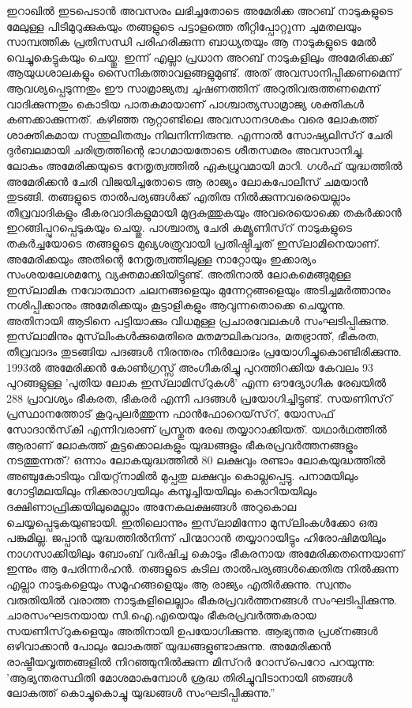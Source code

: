 ഇറാഖില്‍ ഇടപെടാന്‍ അവസരം ലഭിച്ചതോടെ അമേരിക്ക അറബ് നാടുകളുടെ മേലുള്ള പിടിമുറുക്കുകയും തങ്ങളുടെ പട്ടാളത്തെ തീറ്റിപ്പോറ്റുന്ന ചുമതലയും സാമ്പത്തിക പ്രതിസന്ധി പരിഹരിക്കുന്ന ബാധ്യതയും ആ നാടുകളുടെ മേല്‍ വെച്ചുകെട്ടുകയും ചെയ്തു. ഇന്ന് എല്ലാ പ്രധാന അറബ് നാടുകളിലും അമേരിക്കക്ക് ആയുധശാലകളും സൈനികത്താവളങ്ങളുമുണ്ട്. അത് അവസാനിപ്പിക്കണമെന്ന് ആവശ്യപ്പെടുന്നതും ഈ സാമ്രാജ്യത്വ ചൂഷണത്തിന് അറുതിവരുത്തണമെന്ന് വാദിക്കുന്നതും കൊടിയ പാതകമായാണ് പാശ്ചാത്യസാമ്രാജ്യ ശക്തികള്‍ കണക്കാക്കുന്നത്.
കഴിഞ്ഞ നൂറ്റാണ്ടിലെ അവസാനദശകം വരെ ലോകത്ത് ശാക്തികമായ സന്തുലിതത്വം നിലനിന്നിരുന്നു. എന്നാല്‍ സോഷ്യലിസ്‌റ് ചേരി ദുര്‍ബലമായി ചരിത്രത്തിന്റെ ഭാഗമായതോടെ ശീതസമരം അവസാനിച്ചു. ലോകം അമേരിക്കയുടെ നേതൃത്വത്തില്‍ ഏകധ്രുവമായി മാറി. ഗള്‍ഫ് യുദ്ധത്തില്‍ അമേരിക്കന്‍ ചേരി വിജയിച്ചതോടെ ആ രാജ്യം ലോകപോലീസ് ചമയാന്‍ തുടങ്ങി. തങ്ങളുടെ താല്‍പര്യങ്ങള്‍ക്ക് എതിരു നില്‍ക്കുന്നവരെയെല്ലാം തീവ്രവാദികളും ഭീകരവാദികളുമായി മുദ്രകുത്തുകയും അവരെയൊക്കെ തകര്‍ക്കാന്‍ ഇറങ്ങിപ്പുറപ്പെടുകയും ചെയ്തു.
പാശ്ചാത്യ ചേരി കമ്യൂണിസ്‌റ് നാടുകളുടെ തകര്‍ച്ചയോടെ തങ്ങളുടെ മുഖ്യശത്രുവായി പ്രതിഷ്ഠിച്ചത് ഇസ്‌ലാമിനെയാണ്. അമേരിക്കയും അതിന്റെ നേതൃത്വത്തിലുള്ള നാറ്റോയും ഇക്കാര്യം സംശയലേശമന്യേ വ്യക്തമാക്കിയിട്ടുണ്ട്. അതിനാല്‍ ലോകമെങ്ങുമുള്ള ഇസ്‌ലാമിക നവോത്ഥാന ചലനങ്ങളെയും മുന്നേറ്റങ്ങളെയും അടിച്ചമര്‍ത്താനും നശിപ്പിക്കാനും അമേരിക്കയും കൂട്ടാളികളും ആവുന്നതൊക്കെ ചെയ്യുന്നു. അതിനായി ആടിനെ പട്ടിയാക്കും വിധമുള്ള പ്രചാരവേലകള്‍ സംഘടിപ്പിക്കുന്നു. ഇസ്‌ലാമിനും മുസ്‌ലിംകള്‍ക്കുമെതിരെ മതമൗലികവാദം, മതഭ്രാന്ത്, ഭീകരത, തീവ്രവാദം തുടങ്ങിയ പദങ്ങള്‍ നിരന്തരം നിര്‍ലോഭം പ്രയോഗിച്ചുകൊണ്ടിരിക്കുന്നു. 1993ല്‍ അമേരിക്കന്‍ കോണ്‍ഗ്രസ്സ് അംഗീകരിച്ചു പുറത്തിറക്കിയ കേവലം 93 പുറങ്ങളുള്ള 'പുതിയ ലോക ഇസ്‌ലാമിസ്‌റുകള്‍' എന്ന ഔദ്യോഗിക രേഖയില്‍ 288 പ്രാവശ്യം ഭീകരത, ഭീകരര്‍ എന്നീ പദങ്ങള്‍ പ്രയോഗിച്ചിട്ടുണ്ട്. സയണിസ്‌റ് പ്രസ്ഥാനത്തോട് കൂറുപുലര്‍ത്തുന്ന ഫാന്‍ഫോറെയ്‌സ്‌റ്, യോസഫ് സോദാന്‍സ്‌കി എന്നിവരാണ് പ്രസ്തുത രേഖ തയ്യാറാക്കിയത്.
യഥാര്‍ഥത്തില്‍ ആരാണ് ലോകത്ത് കൂട്ടക്കൊലകളും യുദ്ധങ്ങളും ഭീകരപ്രവര്‍ത്തനങ്ങളും നടത്തുന്നത്? ഒന്നാം ലോകയുദ്ധത്തില്‍ 80 ലക്ഷവും രണ്ടാം ലോകയുദ്ധത്തില്‍ അഞ്ചുകോടിയും വിയറ്റ്‌നാമില്‍ മുപ്പതു ലക്ഷവും കൊല്ലപ്പെട്ടു. പനാമയിലും ഗോട്ടിമലയിലും നിക്കരാഗ്വയിലും കമ്പൂച്ചിയയിലും കൊറിയയിലും ദക്ഷിണാഫ്രിക്കയിലുമെല്ലാം അനേകലക്ഷങ്ങള്‍ അറുകൊല ചെയ്യപ്പെടുകയുണ്ടായി. ഇതിലൊന്നും ഇസ്‌ലാമിന്നോ മുസ്‌ലിംകള്‍ക്കോ ഒരു പങ്കുമില്ല.
ജപ്പാന്‍ യുദ്ധത്തില്‍നിന്ന് പിന്മാറാന്‍ തയ്യാറായിട്ടും ഹിരോഷിമയിലും നാഗസാക്കിയിലും ബോംബ് വര്‍ഷിച്ച കൊടും ഭീകരനായ അമേരിക്കതന്നെയാണ് ഇന്നും ആ പേരിന്നര്‍ഹന്‍. തങ്ങളുടെ കുടില താല്‍പര്യങ്ങള്‍ക്കെതിരു നില്‍ക്കുന്ന എല്ലാ നാടുകളെയും സമൂഹങ്ങളെയും ആ രാജ്യം എതിര്‍ക്കുന്നു. സ്വന്തം വരുതിയില്‍ വരാത്ത നാടുകളിലെല്ലാം ഭീകരപ്രവര്‍ത്തനങ്ങള്‍ സംഘടിപ്പിക്കുന്നു. ചാരസംഘടനയായ സി.ഐ.എയെയും ഭീകരപ്രവര്‍ത്തകരായ സയണിസ്‌റുകളെയും അതിനായി ഉപയോഗിക്കുന്നു. ആഭ്യന്തര പ്രശ്‌നങ്ങള്‍ ഒഴിവാക്കാന്‍ പോലും ലോകത്ത് യുദ്ധങ്ങളുണ്ടാക്കുന്നു. അമേരിക്കന്‍ രാഷ്ട്രീയവൃത്തങ്ങളില്‍ നിറഞ്ഞുനില്‍ക്കുന്ന മിസ്‌റര്‍ റോസ്‌പെറോ പറയുന്നു: 'ആഭ്യന്തരസ്ഥിതി മോശമാകുമ്പോള്‍ ശ്രദ്ധ തിരിച്ചുവിടാനായി ഞങ്ങള്‍ ലോകത്ത് കൊച്ചുകൊച്ചു യുദ്ധങ്ങള്‍ സംഘടിപ്പിക്കുന്നു.''
